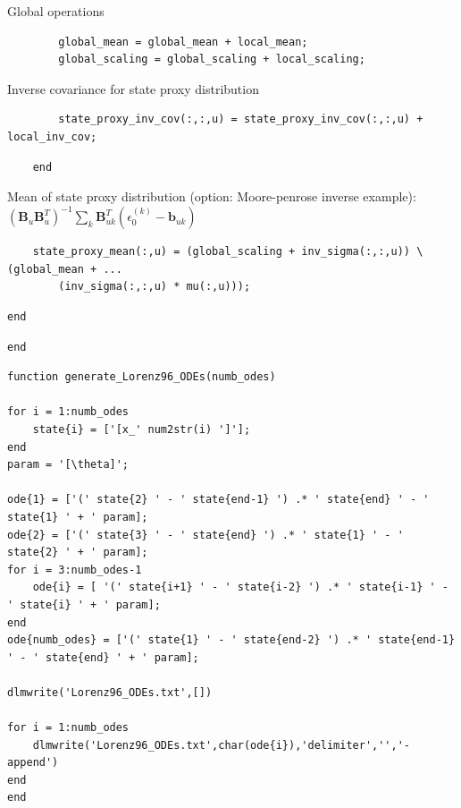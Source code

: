 \color{black}
\begin{par}
Global operations
\end{par} \vspace{1em}
\color{RoyalPurple}\begin{verbatim}
        global_mean = global_mean + local_mean;
        global_scaling = global_scaling + local_scaling;
\end{verbatim}
\color{black}
\begin{par}
Inverse covariance for state proxy distribution
\end{par} \vspace{1em}
\color{RoyalPurple}\begin{verbatim}
        state_proxy_inv_cov(:,:,u) = state_proxy_inv_cov(:,:,u) + local_inv_cov;
\end{verbatim}
\color{black}
\color{RoyalPurple}\begin{verbatim}
    end
\end{verbatim}
\color{black}
\begin{par}
Mean of state proxy distribution (option: Moore-penrose inverse example): $\left( \mathbf{B}_{u} \mathbf{B}_{u}^T \right)^{-1} \sum_k \mathbf{B}_{uk}^T \left(\epsilon_0^{(k)} -\mathbf{b}_{uk} \right)$
\end{par} \vspace{1em}
\color{RoyalPurple}\begin{verbatim}
    state_proxy_mean(:,u) = (global_scaling + inv_sigma(:,:,u)) \ (global_mean + ...
        (inv_sigma(:,:,u) * mu(:,u)));
\end{verbatim}
\color{black}
\color{RoyalPurple}\begin{verbatim}
end
\end{verbatim}
\color{black}
\color{RoyalPurple}\begin{verbatim}
end
\end{verbatim}
\color{black}
\begin{par}

\end{par} \vspace{1em}
\color{RoyalPurple}\begin{verbatim}
function generate_Lorenz96_ODEs(numb_odes)

for i = 1:numb_odes
    state{i} = ['[x_' num2str(i) ']'];
end
param = '[\theta]';

ode{1} = ['(' state{2} ' - ' state{end-1} ') .* ' state{end} ' - ' state{1} ' + ' param];
ode{2} = ['(' state{3} ' - ' state{end} ') .* ' state{1} ' - ' state{2} ' + ' param];
for i = 3:numb_odes-1
    ode{i} = [ '(' state{i+1} ' - ' state{i-2} ') .* ' state{i-1} ' - ' state{i} ' + ' param];
end
ode{numb_odes} = ['(' state{1} ' - ' state{end-2} ') .* ' state{end-1} ' - ' state{end} ' + ' param];

dlmwrite('Lorenz96_ODEs.txt',[])

for i = 1:numb_odes
    dlmwrite('Lorenz96_ODEs.txt',char(ode{i}),'delimiter','','-append')
end
end
\end{verbatim}
